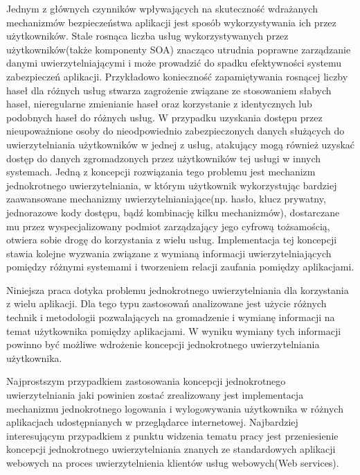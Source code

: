 Jednym z głównych czynników wpływających na skuteczność wdrażanych mechanizmów bezpieczeństwa aplikacji jest sposób wykorzystywania ich przez użytkowników. Stale rosnąca liczba usług wykorzystywanych przez użytkowników(także komponenty SOA) znacząco utrudnia poprawne zarządzanie danymi uwierzytelniającymi i może prowadzić do spadku efektywności systemu zabezpieczeń aplikacji. Przykładowo konieczność zapamiętywania rosnącej liczby haseł dla różnych usług stwarza zagrożenie związane ze stosowaniem słabych haseł, nieregularne zmienianie haseł oraz korzystanie z identycznych lub podobnych haseł do różnych usług. W przypadku uzyskania dostępu przez nieupoważnione osoby do nieodpowiednio zabezpieczonych danych służących do uwierzytelniania użytkowników w jednej z usług, atakujący mogą również uzyskać dostęp do danych zgromadzonych przez użytkowników tej usługi w innych systemach. Jedną z koncepcji rozwiązania tego problemu jest mechanizm jednokrotnego uwierzytelniania, w którym użytkownik wykorzystując bardziej zaawansowane mechanizmy uwierzytelnianiające(np. hasło, klucz prywatny, jednorazowe kody dostępu, bądź kombinację kilku mechanizmów), dostarczane mu przez wyspecjalizowany podmiot zarządzający jego cyfrową tożsamością, otwiera sobie drogę do korzystania z wielu usług. Implementacja tej koncepcji stawia kolejne wyzwania związane z wymianą informacji uwierzytelniających pomiędzy różnymi systemami i tworzeniem relacji zaufania pomiędzy aplikacjami.


\label{sec:celePracy}

	Niniejsza praca dotyka problemu jednokrotnego uwierzytelniania dla korzystania z wielu aplikacji. Dla tego typu zastosowań analizowane jest użycie różnych technik i metodologii pozwalających na gromadzenie i wymianę informacji na temat użytkownika pomiędzy aplikacjami. W wyniku wymiany tych informacji powinno być możliwe wdrożenie koncepcji jednokrotnego uwierzytelniania użytkownika.

	Najprostszym przypadkiem zastosowania koncepcji jednokrotnego uwierzytelniania jaki powinien zostać zrealizowany jest implementacja mechanizmu jednokrotnego logowania i wylogowywania użytkownika w różnych aplikacjach udostępnianych w przeglądarce internetowej. Najbardziej interesującym przypadkiem z punktu widzenia tematu pracy jest przeniesienie koncepcji jednokrotnego uwierzytelniania znanych ze standardowych aplikacji webowych na proces uwierzytelnienia klientów usług webowych(Web services).

